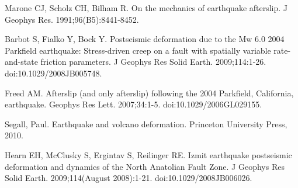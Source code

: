 \documentclass[12pt]{article}
\begin{document}
\begin{thebibliography}{}
 Marone CJ, Scholz CH,
  Bilham R. On the mechanics of earthquake afterslip. J Geophys
  Res. 1991;96(B5):8441-8452.

 Barbot S, Fialko Y, Bock
  Y. Postseismic deformation due to the Mw 6.0 2004 Parkfield
  earthquake: Stress-driven creep on a fault with spatially variable
  rate-and-state friction parameters. J Geophys Res Solid
  Earth. 2009;114:1-26. doi:10.1029/2008JB005748.


 Freed AM. Afterslip (and only
  afterslip) following the 2004 Parkfield, California,
  earthquake. Geophys Res Lett. 2007;34:1-5. doi:10.1029/2006GL029155.



 Segall, Paul. Earthquake and
  volcano deformation. Princeton University Press, 2010.

 Hearn EH, McClusky S, Ergintav S,
  Reilinger RE. Izmit earthquake postseismic deformation and dynamics
  of the North Anatolian Fault Zone. J Geophys Res Solid
  Earth. 2009;114(August 2008):1-21. doi:10.1029/2008JB006026.



\end{thebibliography}
\end{document}
